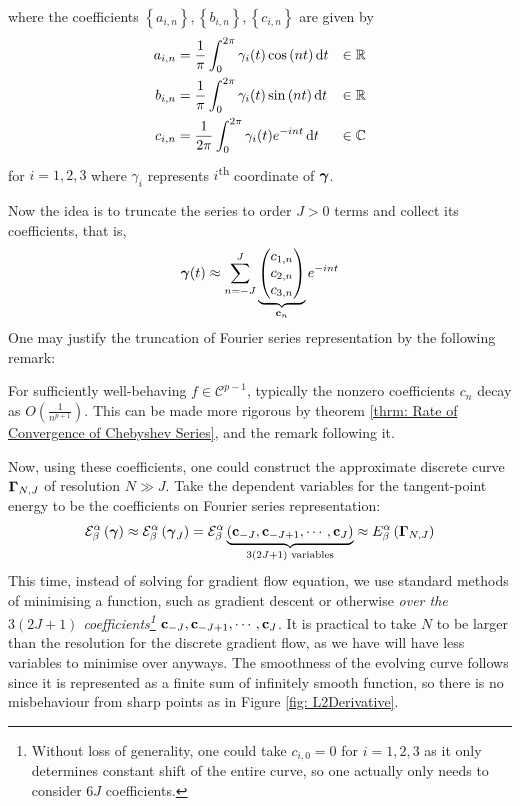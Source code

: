 \documentclass[../dissertation.tex]{subfiles}
\begin{document}
where the coefficients $\left\{ a_{i,n} \right\}, \left\{ b_{i,n} \right\}, \left\{ c_{i,n} \right\}$ are given by
\begin{align}
    a_{i,n} &= \frac{1}{\pi} \int_{0}^{2\pi} \gamma_i (t) \cos {\left( nt \right)} \, \text{d} t & \in \mathbb{R}\\
    b_{i,n} &= \frac{1}{\pi} \int_{0}^{2\pi} \gamma_i (t) \sin {\left( nt \right)} \, \text{d} t & \in \mathbb{R}\\
    c_{i,n} &= \frac{1}{2\pi} \int_{0}^{2\pi} \gamma_i (t) e^{-int} \, \text{d} t & \in \mathbb{C}
\end{align}
for $i=1, 2, 3$ where $\gamma_i$ represents $i$\textsuperscript{th} coordinate of $\boldsymbol{\gamma}$.

Now the idea is to truncate the series to order $J > 0$ terms and collect its coefficients,
that is,
\begin{equation*}
    \boldsymbol{\gamma}(t) \approx \sum_{n=-J}^{J}
    \underbrace{
    \begin{pmatrix}
        c_{1,n} \\
        c_{2,n} \\
        c_{3,n}
    \end{pmatrix}
}_{\mathbf{c}_n}
    e^{-int}
\end{equation*}
One may justify the truncation of Fourier series representation by the following remark:
\begin{remark}
    For sufficiently well-behaving $f \in \mathcal{C}^{p-1}$, typically the nonzero coefficients $c_n$ decay as $O\left( \frac{1}{n^{p+1}} \right)$.
    This can be made more rigorous by theorem \ref{thrm: Rate of Convergence of Chebyshev Series},
    and the remark following it.
\end{remark}
Now, using these coefficients, one could construct the approximate discrete curve $\boldsymbol{\Gamma}_{N,J}$ of resolution $N \gg J$.
Take the dependent variables for the tangent-point energy to be the coefficients on Fourier series representation:
\begin{equation}
    \mathcal{E}_{\beta}^{\alpha} \left( \boldsymbol{\gamma} \right)
    \approx
    \mathcal{E}_{\beta}^{\alpha} \left( \boldsymbol{\gamma}_{J} \right)
    =
    \mathcal{E}_{\beta}^{\alpha} \underbrace{\left( \mathbf{c}_{-J}, \mathbf{c}_{-J+1}, \cdots, \mathbf{c}_{J} \right)}_{3\left( 2J+1 \right) \text{ variables}}
    \approx
    E_{\beta}^{\alpha} \left( \boldsymbol{\Gamma}_{N,J} \right)
\end{equation}
This time, instead of solving for gradient flow equation,
we use standard methods of minimising a function, such as gradient descent or otherwise \textit{over the $3(2J+1)$ coefficients\footnote{Without loss of generality, one could take $c_{i,0} = 0$ for $i=1,2,3$ as it only determines constant shift of the entire curve, so one actually only needs to consider $6J$ coefficients.}} $\mathbf{c}_{-J}, \mathbf{c}_{-J+1}, \cdots, \mathbf{c}_{J}$.
It is practical to take $N$ to be larger than the resolution for the discrete gradient flow,
as we have will have less variables to minimise over anyways.
The smoothness of the evolving curve follows since it is represented as a finite sum of infinitely smooth function,
so there is no misbehaviour from sharp points as in Figure \ref{fig: L2Derivative}.
\end{document}
